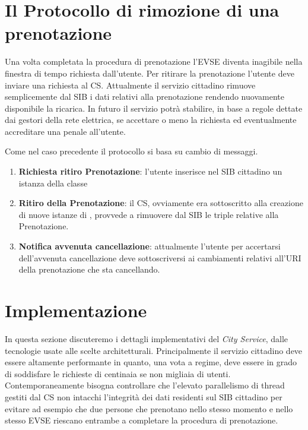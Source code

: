\section{Il Protocollo di rimozione di una prenotazione}

Una volta completata la procedura di prenotazione l'EVSE diventa inagibile nella finestra di tempo richiesta dall'utente. Per ritirare la prenotazione l'utente deve inviare una richiesta al CS. Attualmente il servizio cittadino rimuove semplicemente dal SIB i dati relativi alla prenotazione rendendo nuovamente disponibile la ricarica. In futuro il servizio potrà stabilire, in base a regole dettate dai gestori della rete elettrica, se accettare o meno la richiesta ed eventualmente accreditare una penale all'utente.

Come nel caso precedente il protocollo si basa su cambio di messaggi.

\begin{enumerate}
	\item \textbf{Richiesta ritiro Prenotazione}: l'utente inserisce nel SIB cittadino un istanza della classe  
	\item \textbf{Ritiro della Prenotazione}: il CS, ovviamente era sottoscritto alla creazione di nuove istanze di , provvede a rimuovere dal SIB le triple relative alla Prenotazione.
	\item \textbf{Notifica avvenuta cancellazione}: attualmente l'utente per accertarsi dell'avvenuta cancellazione deve sottoscriversi ai cambiamenti relativi all'URI della prenotazione che sta cancellando.
\end{enumerate}

\section{Implementazione}\label{sec:impl}

In questa sezione discuteremo i dettagli implementativi del \emph{City Service}, dalle tecnologie usate alle scelte architetturali. Principalmente il servizio cittadino deve essere altamente performante in quanto, una vota a regime, deve essere in grado di soddisfare le richieste di centinaia se non migliaia di utenti. Contemporaneamente bisogna controllare che l'elevato parallelismo di thread gestiti dal CS non intacchi l'integrità dei dati residenti sul SIB cittadino per evitare ad esempio che due persone che prenotano nello stesso momento e nello stesso EVSE riescano entrambe a completare la procedura di prenotazione. 


